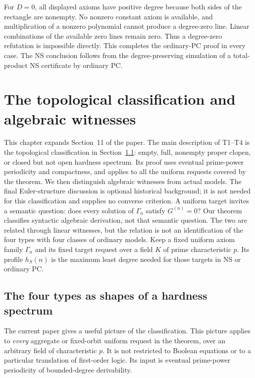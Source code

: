 \documentclass[11pt,a4paper,oneside,openany]{book}
\theoremstyle{definition}\newtheorem{definition}[theorem]{Definition}
\theoremstyle{remark}\newtheorem{remark}[theorem]{Remark}
\numberwithin{equation}{chapter}
\begin{document}
For $D=0$, all displayed axioms have positive degree because both sides
of the rectangle are nonempty.  No nonzero constant axiom is available,
and multiplication of a nonzero polynomial cannot produce a degree-zero
line.  Linear combinations of the available zero lines remain zero.
Thus a degree-zero refutation is impossible directly.  This completes
the ordinary-PC proof in every case.  The NS conclusion follows from
the degree-preserving simulation of a total-product NS certificate by
ordinary PC.

\chapter{The topological classification and algebraic witnesses}
\label{tx:sec:model-theory}
This chapter expands Section~11 of the paper. The main description of
T1--T4 is the topological classification in
Section~\ref{tx:sec:topological-spectrum}: empty, full, nonempty proper
clopen, or closed but not open hardness spectrum. Its proof uses eventual
prime-power periodicity and compactness, and applies to all the uniform
requests covered by the theorem.
We then distinguish algebraic witnesses from actual models. The final
Euler-structure discussion is optional historical background; it is
not needed for this classification and supplies no converse criterion.
A uniform target invites a semantic question: does every solution of
$\Gamma_n$ satisfy $G^{(n)}=0$? Our theorem classifies syntactic algebraic
derivation, not that semantic question. The two are related through
linear witnesses, but the relation is not an identification of the four
types with four classes of ordinary models.
Keep a fixed uniform axiom family $\Gamma_n$ and its fixed target request
over a field $K$ of prime characteristic $p$. Its profile $h_S(n)$ is
the maximum least degree needed for those targets in NS or ordinary PC.

\section{The four types as shapes of a hardness spectrum}
\label{tx:sec:topological-spectrum}
The current paper gives a useful picture of the classification. This
picture applies to \emph{every} aggregate or fixed-orbit uniform request
in the theorem, over an arbitrary field of characteristic $p$. It is
not restricted to Boolean equations or to a particular translation of
first-order logic. Its input is eventual prime-power periodicity of
bounded-degree derivability.
\end{document}
